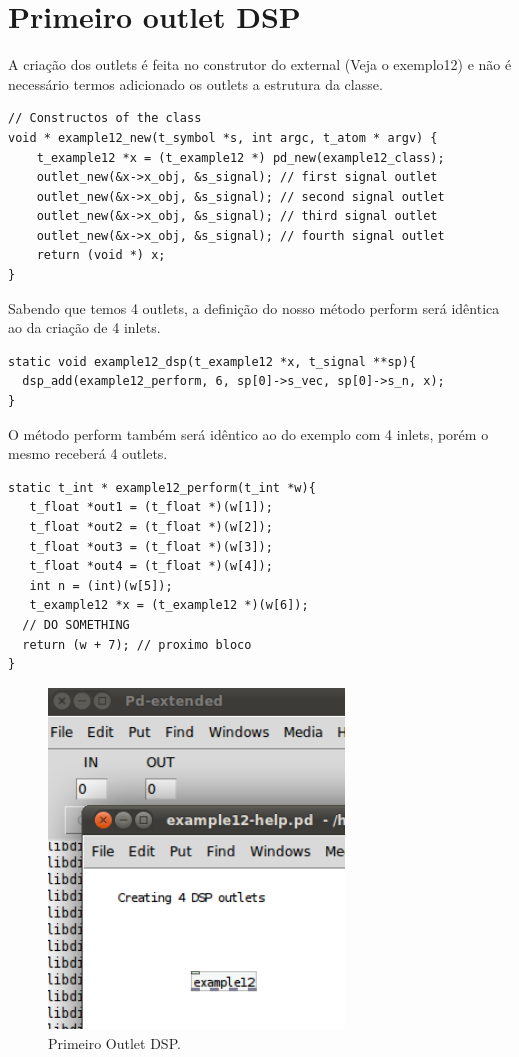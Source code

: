 \documentclass[10pt,a4paper]{report}
\begin{document}
\section{Primeiro outlet DSP}

A criação dos outlets é feita no construtor do external (Veja o exemplo12) e não é necessário termos adicionado os outlets a estrutura da classe.

\begin{lstlisting}
// Constructos of the class
void * example12_new(t_symbol *s, int argc, t_atom * argv) {
    t_example12 *x = (t_example12 *) pd_new(example12_class);
    outlet_new(&x->x_obj, &s_signal); // first signal outlet
    outlet_new(&x->x_obj, &s_signal); // second signal outlet
    outlet_new(&x->x_obj, &s_signal); // third signal outlet
    outlet_new(&x->x_obj, &s_signal); // fourth signal outlet
    return (void *) x;
}
\end{lstlisting}

Sabendo que temos 4 outlets, a definição do nosso método perform será idêntica ao da criação de 4 inlets.

\begin{lstlisting}
static void example12_dsp(t_example12 *x, t_signal **sp){
  dsp_add(example12_perform, 6, sp[0]->s_vec, sp[0]->s_n, x);
}
\end{lstlisting}

O método perform também será idêntico ao do exemplo com 4 inlets, porém o mesmo receberá 4 outlets.

\begin{lstlisting}
static t_int * example12_perform(t_int *w){
   t_float *out1 = (t_float *)(w[1]);
   t_float *out2 = (t_float *)(w[2]);
   t_float *out3 = (t_float *)(w[3]);
   t_float *out4 = (t_float *)(w[4]);
   int n = (int)(w[5]);
   t_example12 *x = (t_example12 *)(w[6]);
  // DO SOMETHING
  return (w + 7); // proximo bloco
}
\end{lstlisting}

\begin{figure}[h!]
	\centering
	\includegraphics[width=0.7\textwidth]{example12}
	\caption{Primeiro Outlet DSP.}
\end{figure}
\end{document}
